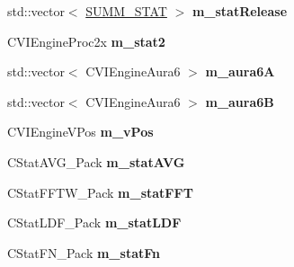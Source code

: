 \begin{DoxyCompactItemize}
\item 
\hypertarget{class_c_v_i_engine_base_ab0a3c99fb49cddb42615132833b483d5}{std\+::vector$<$ \hyperlink{class_s_u_m_m___s_t_a_t}{S\+U\+M\+M\+\_\+\+S\+T\+A\+T} $>$ {\bfseries m\+\_\+stat\+Release}}\label{class_c_v_i_engine_base_ab0a3c99fb49cddb42615132833b483d5}

\item 
\hypertarget{class_c_v_i_engine_base_a91282745c78c776f8922e20c4f3198f5}{C\+V\+I\+Engine\+Proc2x {\bfseries m\+\_\+stat2}}\label{class_c_v_i_engine_base_a91282745c78c776f8922e20c4f3198f5}

\item 
\hypertarget{class_c_v_i_engine_base_aa4b9c935b9223f0efcc05282e871254d}{std\+::vector$<$ C\+V\+I\+Engine\+Aura6 $>$ {\bfseries m\+\_\+aura6\+A}}\label{class_c_v_i_engine_base_aa4b9c935b9223f0efcc05282e871254d}

\item 
\hypertarget{class_c_v_i_engine_base_a4415e8a105218982c6358907ae6f380e}{std\+::vector$<$ C\+V\+I\+Engine\+Aura6 $>$ {\bfseries m\+\_\+aura6\+B}}\label{class_c_v_i_engine_base_a4415e8a105218982c6358907ae6f380e}

\item 
\hypertarget{class_c_v_i_engine_base_afab397345881a9b8a44e6f8eae9805f0}{C\+V\+I\+Engine\+V\+Pos {\bfseries m\+\_\+v\+Pos}}\label{class_c_v_i_engine_base_afab397345881a9b8a44e6f8eae9805f0}

\item 
\hypertarget{class_c_v_i_engine_base_aad8ff35fe2bc6a8d6da03b8f93ea3341}{C\+Stat\+A\+V\+G\+\_\+\+Pack {\bfseries m\+\_\+stat\+A\+V\+G}}\label{class_c_v_i_engine_base_aad8ff35fe2bc6a8d6da03b8f93ea3341}

\item 
\hypertarget{class_c_v_i_engine_base_a475ef6e1419c21ec5d68097a4cd822ee}{C\+Stat\+F\+F\+T\+W\+\_\+\+Pack {\bfseries m\+\_\+stat\+F\+F\+T}}\label{class_c_v_i_engine_base_a475ef6e1419c21ec5d68097a4cd822ee}

\item 
\hypertarget{class_c_v_i_engine_base_abb0ef36905047eafd79bea2911824b7f}{C\+Stat\+L\+D\+F\+\_\+\+Pack {\bfseries m\+\_\+stat\+L\+D\+F}}\label{class_c_v_i_engine_base_abb0ef36905047eafd79bea2911824b7f}

\item 
\hypertarget{class_c_v_i_engine_base_a8628211a0ca23ea36cf4059f3ab47f74}{C\+Stat\+F\+N\+\_\+\+Pack {\bfseries m\+\_\+stat\+Fn}}\label{class_c_v_i_engine_base_a8628211a0ca23ea36cf4059f3ab47f74}


\end{DoxyCompactItemize}
